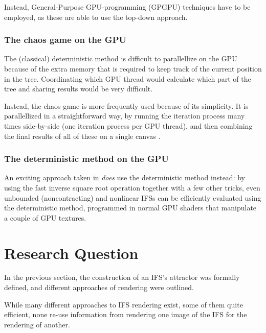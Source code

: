 \documentclass[11pt]{article}
\begin{document}

Instead, General-Purpose GPU-programming (GPGPU) techniques have to be employed, as these are able to use the top-down approach.

\subsubsection{The chaos game on the GPU}
\label{sec:org8486d22}
\label{subsection:chaos_game_gpu}

The (classical) deterministic method is difficult to parallellize on the GPU because of the extra memory that is required to keep track of the current position in the tree.
Coordinating which GPU thread would calculate which part of the tree and sharing results would be very difficult.

Instead, the chaos game is more frequently used because of its simplicity. 
It is parallellized in a straightforward way, 
by running the iteration process many times side-by-side (one iteration process per GPU thread),
and then combining the final results of all of these on a single canvas \cite{green2005gpu}.

\subsubsection{The deterministic method on the GPU}
\label{sec:org16f9088}
\label{subsection:deterministic_gpu}

An exciting approach taken in \cite{lawlor2012gpu} \emph{does} use the deterministic method instead:
by using the fast inverse square root operation together with a few other tricks, 
even unbounded (noncontracting) and nonlinear IFSs can be efficiently
evaluated using the deterministic method, programmed in normal GPU shaders that manipulate a couple of GPU textures.

\section{Research Question}
\label{sec:org575d501}
\label{section:research_question}

In the previous section, the construction of an IFS's attractor was formally defined, 
and different approaches of rendering were outlined.

While many different approaches to IFS rendering exist, some of them quite efficient,
none re-use information from rendering one image of the IFS for the rendering of another.
\end{document}
